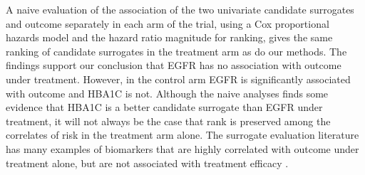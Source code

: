 \documentclass[times, doublespace]{simauth}
\begin{document}
A naive evaluation of the association of the two univariate candidate surrogates and outcome separately in each arm
of the trial, using a Cox proportional hazards model and the hazard ratio magnitude for ranking, gives the same ranking of candidate surrogates in the treatment arm as do our methods. The findings support our conclusion that EGFR has no association with outcome under treatment. However, in the control arm EGFR is significantly associated with outcome and HBA1C is not. Although the naive analyses finds some evidence that HBA1C is a better candidate surrogate than EGFR under treatment, it will not always be the case that rank is preserved among the correlates of risk in the treatment arm alone. The surrogate evaluation literature has many examples of biomarkers that are highly correlated with outcome under treatment alone, but are not associated with treatment efficacy \citep{flemming96}.  
\end{document}
